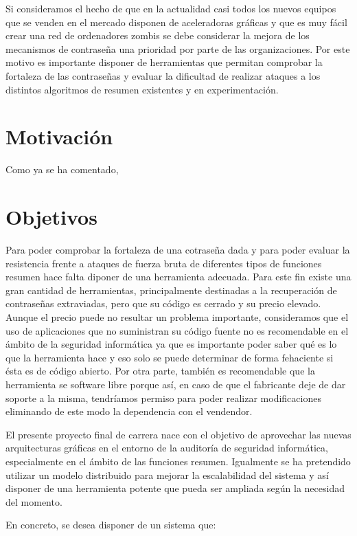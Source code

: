 Si consideramos el hecho de que en la actualidad casi todos los nuevos equipos que se venden en el mercado disponen de aceleradoras gráficas y que es muy fácil crear una red de ordenadores zombis se debe considerar la mejora de los mecanismos de contraseña una prioridad por parte de las organizaciones. Por este motivo es importante disponer de herramientas que permitan comprobar la fortaleza de las contraseñas y evaluar la dificultad de realizar ataques a los distintos algoritmos de resumen existentes y en experimentación.

\section{Motivación}

Como ya se ha comentado, 
\section{Objetivos}

Para poder comprobar la fortaleza de una cotraseña dada y para poder evaluar la resistencia frente a ataques de fuerza bruta de diferentes tipos de funciones resumen hace falta diponer de una herramienta adecuada. Para este fin existe una gran cantidad de herramientas, principalmente destinadas a la recuperación de contraseñas extraviadas, pero que su código es cerrado y su precio elevado. Aunque el precio puede no resultar un problema importante, consideramos que el uso de aplicaciones que no suministran su código fuente no es recomendable en el ámbito de la seguridad informática ya que es importante poder saber qué es lo que la herramienta hace y eso solo se puede determinar de forma fehaciente si ésta es de código abierto. Por otra parte, también es recomendable que la herramienta se software libre porque así, en caso de que el fabricante deje de dar soporte a la misma, tendríamos permiso para poder realizar modificaciones eliminando de este modo la dependencia con el vendendor.

El presente proyecto final de carrera nace con el objetivo de aprovechar las nuevas arquitecturas gráficas en el entorno de la auditoría de seguridad informática, especialmente en el ámbito de las funciones resumen. Igualmente se ha pretendido utilizar un modelo distribuido para mejorar la escalabilidad del sistema y así disponer de una herramienta potente que pueda ser ampliada según la necesidad del momento.

En concreto, se desea disponer de un sistema que:

